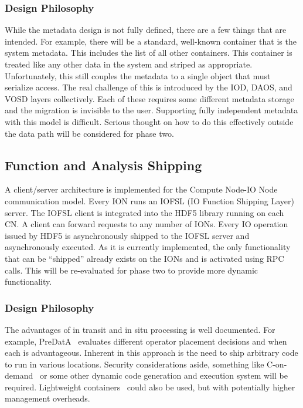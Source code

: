 \documentclass[conference]{IEEEtran} \pdfpagewidth=8.5in
\begin{document}
\subsubsection{Design Philosophy}

While the metadata design is not fully defined, there are a few things that
are intended. For example, there will be a standard, well-known container that
is the system metadata. This includes the list of all other containers. This
container is treated like any other data in the system and striped as
appropriate. Unfortunately, this still couples the metadata to a single object
that must serialize access.
The real challenge of
this is introduced by the IOD, DAOS, and VOSD layers collectively. Each of
these requires some different metadata storage and the migration is invisible
to the user.  Supporting fully independent metadata with this model is
difficult. Serious thought on how to do this effectively outside the data path
will be considered for phase two.

\subsection{Function and Analysis Shipping}
\label{sec:fn-shipping}

A client/server architecture is implemented for the Compute Node-IO Node
communication model.  Every ION runs an IOFSL (IO Function Shipping Layer)
server. The IOFSL client is integrated into the HDF5 library running on each
CN. A client can forward requests to any number of IONs. Every IO operation
issued by HDF5 is asynchronously shipped to the IOFSL server and asynchronously
executed. As it is currently implemented, the only functionality that can be
``shipped'' already exists on the IONs and is activated using RPC calls. This
will be re-evaluated for phase two to provide more dynamic functionality.

\subsubsection{Design Philosophy}

The advantages of in transit and in situ processing is well documented. For
example, PreDatA~\cite{zheng:2010:predata} evaluates different operator
placement decisions and when each is advantageous. Inherent in this approach is
the need to ship arbitrary code to run in various locations. Security
considerations aside, something like C-on-demand~\cite{abbasi:2011:c-on-demand}
or some other dynamic code generation and execution system will be required.
Lightweight containers~\cite{merkel:2014:docker} could also be used, but with
potentially higher management overheads.
\end{document}
